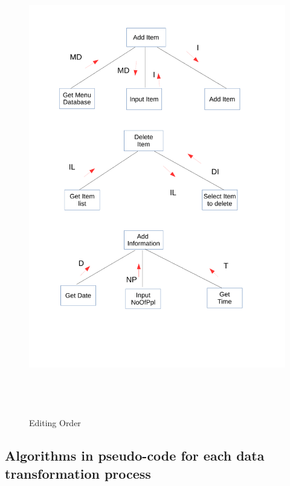 \begin{figure}[H]
    \includegraphics[height = 20cm]{./Design/Images/structure3}
    \caption{Editing Order} \label{fig:Structure3}
\end{figure}

\subsection{Algorithms in pseudo-code for each data transformation process}


